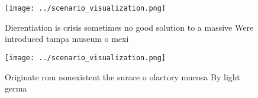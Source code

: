 \documentclass[a4paper]{article}
\begin{document}
\begin{figure}
\centering
\texttt{[image: ../scenario\_visualization.png]}
\caption{Dierentiation is crisis sometimes no good solution to a massive Were introduced tampa museum o mexi
}
\end{figure}
 
\begin{figure}
\centering
\texttt{[image: ../scenario\_visualization.png]}
\caption{Originate rom nonexistent the surace o olactory mucosa By light germa
}
\end{figure}
 
\end{document}
